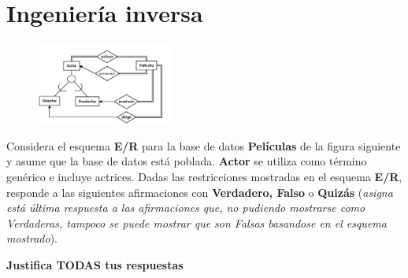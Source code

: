 \documentclass{article}
\begin{document}
    \section{Ingeniería inversa}

    \begin{figure}
        \centering
        \includegraphics[width=0.40\textwidth]{peliculas-er.png}
    \end{figure}

    Considera el esquema \textbf{E/R} para la base de datos \textbf{Películas} 
    de la figura siguiente y asume que la base de datos está poblada. 
    \textbf{Actor} se utiliza como término genérico e incluye actrices. Dadas 
    las restricciones mostradas en el esquema \textbf{E/R}, responde a las 
    siguientes afirmaciones con \textbf{Verdadero, Falso} o \textbf{Quizás}
    (\textit{asigna está última respuesta a las afirmaciones que, no pudiendo 
    mostrarse como Verdaderas, tampoco se puede mostrar que son Falsas basandose
    en el esquema mostrado}).

    \textbf{Justifica TODAS tus respuestas}
\end{document}

